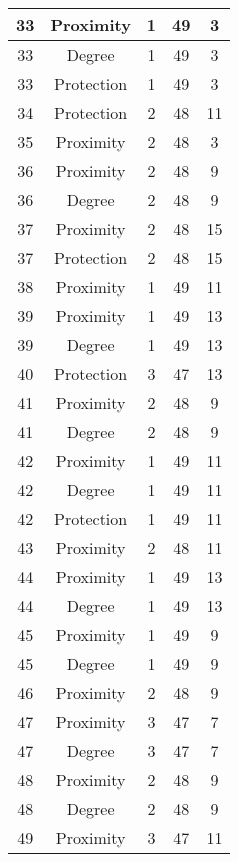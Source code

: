 \documentclass[results.tex]{subfiles}
\begin{document}
\begin{center}
\begin{tabular}{| c || c | c | c | c |}
    \hline
    33 & Proximity & 1 & 49 & 3 \\ 
    \hline
    33 & Degree & 1 & 49 & 3 \\ 
    \hline
    33 & Protection & 1 & 49 & 3 \\ 
    \hline
    34 & Protection & 2 & 48 & 11 \\ 
    \hline
    35 & Proximity & 2 & 48 & 3 \\ 
    \hline
    36 & Proximity & 2 & 48 & 9 \\ 
    \hline
    36 & Degree & 2 & 48 & 9 \\ 
    \hline
    37 & Proximity & 2 & 48 & 15 \\ 
    \hline
    37 & Protection & 2 & 48 & 15 \\ 
    \hline
    38 & Proximity & 1 & 49 & 11 \\ 
    \hline
    39 & Proximity & 1 & 49 & 13 \\ 
    \hline
    39 & Degree & 1 & 49 & 13 \\ 
    \hline
    40 & Protection & 3 & 47 & 13 \\ 
    \hline
    41 & Proximity & 2 & 48 & 9 \\ 
    \hline
    41 & Degree & 2 & 48 & 9 \\ 
    \hline
    42 & Proximity & 1 & 49 & 11 \\ 
    \hline
    42 & Degree & 1 & 49 & 11 \\ 
    \hline
    42 & Protection & 1 & 49 & 11 \\ 
    \hline
    43 & Proximity & 2 & 48 & 11 \\ 
    \hline
    44 & Proximity & 1 & 49 & 13 \\ 
    \hline
    44 & Degree & 1 & 49 & 13 \\ 
    \hline
    45 & Proximity & 1 & 49 & 9 \\ 
    \hline
    45 & Degree & 1 & 49 & 9 \\ 
    \hline
    46 & Proximity & 2 & 48 & 9 \\ 
    \hline
    47 & Proximity & 3 & 47 & 7 \\ 
    \hline
    47 & Degree & 3 & 47 & 7 \\ 
    \hline
    48 & Proximity & 2 & 48 & 9 \\ 
    \hline
    48 & Degree & 2 & 48 & 9 \\ 
    \hline
    49 & Proximity & 3 & 47 & 11 \\ 
    \hline   \end{tabular}
\end{center}
\end{document}

